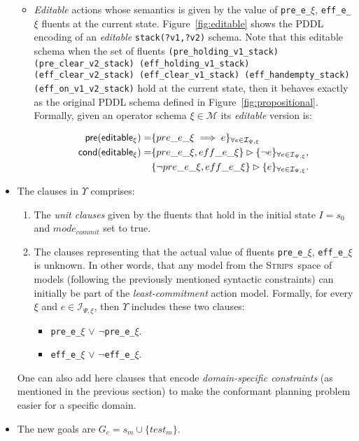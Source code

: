 \documentclass{article}
\newcommand{\pre}{\mathsf{pre}}     %
\newcommand{\cond}{\mathsf{cond}}   %
\newcommand{\strips}{\textsc{Strips}}
\begin{document}
\begin{itemize}
\begin{itemize}
      \item {\em Editable} actions whose semantics is given by the value of {\tt\small pre\_e\_$\xi$}, {\tt\small eff\_e\_$\xi$} fluents at the current state. Figure~\ref{fig:editable} shows the PDDL encoding of an {\em editable} {\tt\small stack(?v1,?v2)} schema. Note that this editable schema when the set of fluents {\tiny\tt (pre\_holding\_v1\_stack) (pre\_clear\_v2\_stack) (eff\_holding\_v1\_stack) (eff\_clear\_v2\_stack) (eff\_clear\_v1\_stack) (eff\_handempty\_stack) (eff\_on\_v1\_v2\_stack)} hold at the current state, then it behaves exactly as the original PDDL schema defined in Figure~\ref{fig:propositional}. Formally, given an operator schema $\xi\in\mathcal{M}$ its {\em editable} version is:
\begin{small}  
\begin{align*}
\hspace*{7pt}\pre(\mathsf{editable_{\xi}})=&\{pre\_e\_\xi\implies e\}_{\forall e\in{\mathcal I}_{\Psi,\xi}}\\
\cond(\mathsf{editable_{\xi}})=&\{pre\_e\_\xi, eff\_e\_\xi\}\rhd\{\neg e\}_{\forall e\in{\mathcal I}_{\Psi,\xi}},\\
&\{\neg pre\_e\_\xi, eff\_e\_\xi\}\rhd\{e\}_{\forall e\in{\mathcal I}_{\Psi,\xi}}.
\end{align*}
\end{small}

\end{itemize}

\item The clauses in $\Upsilon$ comprises:
      \begin{enumerate}
      \item The {\em unit clauses} given by the fluents that hold in the initial state $I=s_0$ and $mode_{commit}$ set to true.
      \item The clauses representing that the actual value of fluents {\tt\small pre\_e\_$\xi$}, {\tt\small eff\_e\_$\xi$} is unknown. In other words, that any model from the \strips\ space of models (following the previously mentioned syntactic constraints) can initially be part of the {\em least-commitment} action model. Formally, for every $\xi$ and $e\in{\mathcal I}_{\Psi,\xi}$, then $\Upsilon$ includes these two clauses:
            \begin{itemize}
            \item {\tt\small pre\_e\_$\xi$} $\vee$ {\tt\small $\neg$pre\_e\_$\xi$}.
            \item {\tt\small eff\_e\_$\xi$} $\vee$ {\tt\small $\neg$eff\_e\_$\xi$}.
            \end{itemize}
      \end{enumerate}
One can also add here clauses that encode {\em domain-specific constraints} (as mentioned in the previous section) to make the conformant planning problem easier for a specific domain. 
\item The new goals are $G_c=s_m\cup\{test_m\}$.
\end{itemize}
\end{document}
